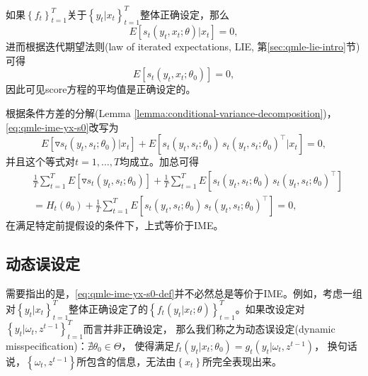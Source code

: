 如果$\left\{ f_{t} \right\}_{t=1}^{T} $关于$\left\{ y_{t} | x_{t} \right\}_{t=1}^{T}$整体正确设定，那么
\begin{equation*}
    E \left[ s_{t} \left( y_{t}, x_{t}; \theta \right) | x_{t} \right] =0,
\end{equation*}
进而根据迭代期望法则(law of iterated expectations, LIE, 第\ref{sec:qmle-lie-intro}节)可得
\begin{equation}
    \label{eq:qmle-ime-yx-s0}
    E \left[ s_{t} \left( y_{t}, x_{t}; \theta_{0} \right) \right] =0,
\end{equation}
因此可见score方程的平均值是正确设定的。

根据条件方差的分解(Lemma \ref{lemma:conditional-variance-decomposition})，\eqref{eq:qmle-ime-yx-s0}改写为
\begin{equation*}
    E \left[
    \triangledown s_{t} \left( y_{t}, s_{t} ; \theta_{0} \right) | x_{t}
    \right]
    + E \left[
    s_{t} \left( y_{t}, s_{t} ; \theta_{0} \right) \,
    s_{t} \left( y_{t}, s_{t} ; \theta_{0} \right)^{\top}
    | x_{t}
    \right] =0,
\end{equation*}
并且这个等式对$t=1,\ldots,T$均成立。加总可得
\begin{equation}
    \label{eq:qmle-ime-yx-s0-def}
\begin{split}
    & \frac{1}{T} \sum_{t=1}^{T} E \left[ \triangledown s_{t} \left( y_{t}, s_{t} ; \theta_{0} \right) \right]
    +
    \frac{1}{T} \sum_{t=1}^{T} E \left[
    s_{t} \left( y_{t}, s_{t} ; \theta_{0} \right) \,
    s_{t} \left( y_{t}, s_{t} ; \theta_{0} \right)^{\top}
    \right] \\
    & =H_{t} \left( \theta_{0} \right)
    + \frac{1}{T} \sum_{t=1}^{T} E
    \left[
    s_{t} \left( y_{t}, s_{t} ; \theta_{0} \right) \,
    s_{t} \left( y_{t}, s_{t} ; \theta_{0} \right)^{\top}
    \right]
    =0,
\end{split}
\end{equation}
在满足特定前提假设的条件下，上式等价于IME。

\subsection{动态误设定}
\label{sec:qmle-ime-dynamic-misspecification}
    需要指出的是，\eqref{eq:qmle-ime-yx-s0-def}并不必然总是等价于IME。例如，考虑一组对$\left\{ y_{t} | x_{t} \right\}_{t=1}^{T}$整体正确设定了的$\left\{ f_{t} \left( y_{t} | x_{t} ; \theta \right) \right\}_{t=1}^{T}$。如果改设定对$\left\{ y_{t} | \omega_{t}, z^{t-1} \right\}_{t=1}^{T}$而言并非正确设定，
    那么我们称之为动态误设定(dynamic misspecification)：$\nexists \theta_{0} \in \Theta$，
    使得满足$f_{t} \left( y_{t} | x_{t}; \theta_{0} \right) = g_{t} \left( y_{t} | \omega_{t}, z^{t-1} \right)$，
    换句话说，$\left\{\omega_{t}, z^{t-1} \right\}$所包含的信息，无法由$\left\{ x_{t} \right\}$所完全表现出来。

